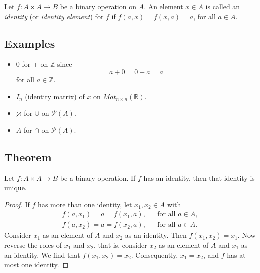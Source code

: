 \documentclass[11pt]{article}
\let\emptyset\varnothing
\begin{document}
    Let \(f: A \times A \rightarrow B\) be a binary operation on $A$. An element \(x \in A\) is called an \emph{identity} (or \emph{identity element}) for $f$ if \(f(a,x) = f(x,a) = a\), for all \(a \in A\).

    \subsection{Examples}

    \begin{itemize}
        \item 0 for + on \(\mathbb{Z}\) since \[a + 0 = 0 + a = a\] for all \(a \in \mathbb{Z}\).
        \item \(I_n\) (identity matrix) of $x$ on \(Mat_{n \times n} (\mathbb{R})\).
        \item \(\emptyset\) for \(\cup\) on \(\mathcal{P}(A)\).
        \item $A$ for \(\cap\) on \(\mathcal{P}(A)\).
    \end{itemize}

    \subsection{Theorem}

    Let \(f : A \times A \rightarrow B\) be a binary operation. If $f$ has an identity, then that identity is unique.
    \begin{proof}
        If $f$ has more than one identity, let \(x_1, x_2 \in A\) with
        \begin{align*}
            f(a, x_1) = a = f(x_1,a), && \text{for all } a \in A, \\
            f(a, x_2) = a = f(x_2,a), && \text{for all } a \in A.
        \end{align*}
        Consider \(x_1\) as an element of $A$ and $x_2$ as an identity. Then \(f(x_1,x_2) = x_1\). Now reverse the roles of \(x_1\) and \(x_2\), that is, consider \(x_2\) as an element of $A$ and $x_1$ as an identity. We find that \(f(x_1,x_2) = x_2\). Consequently, \(x_1 = x_2\), and $f$ has at most one identity.
    \end{proof}
    
\end{document}
